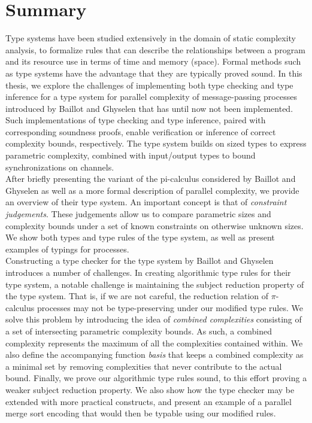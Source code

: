 \section*{Summary}

Type systems have been studied extensively in the domain of static complexity analysis, to formalize rules that can describe the relationships between a program and its resource use in terms of time and memory (space). Formal methods such as type systems have the advantage that they are typically proved sound. In this thesis, we explore the challenges of implementing both type checking and type inference for a type system for parallel complexity of message-passing processes introduced by Baillot and Ghyselen \cite{BaillotGhyselen2021} that has until now not been implemented. Such implementations of type checking and type inference, paired with corresponding soundness proofs, enable verification or inference of correct complexity bounds, respectively. The type system builds on sized types to express parametric complexity, combined with input/output types to bound synchronizations on channels. \\

After briefly presenting the variant of the pi-calculus considered by Baillot and Ghyselen as well as a more formal description of parallel complexity, we provide an overview of their type system. An important concept is that of \textit{constraint judgements}. These judgements allow us to compare parametric sizes and complexity bounds under a set of known constraints on otherwise unknown sizes. We show both types and type rules of the type system, as well as present examples of typings for processes.\\

Constructing a type checker for the type system by Baillot and Ghyselen introduces a number of challenges. In creating algorithmic type rules for their type system, a notable challenge is maintaining the subject reduction property of the type system. That is, if we are not careful, the reduction relation of $\pi$-calculus processes may not be type-preserving under our modified type rules. We solve this problem by introducing the idea of \textit{combined complexities} consisting of a set of intersecting parametric complexity bounds. As such, a combined complexity represents the maximum of all the complexities contained within. We also define the accompanying function \textit{basis} that keeps a combined complexity as a minimal set by removing complexities that never contribute to the actual bound. Finally, we prove our algorithmic type rules sound, to this effort proving a weaker subject reduction property. We also show how the type checker may be extended with more practical constructs, and present an example of a parallel merge sort encoding that would then be typable using our modified rules.\\

